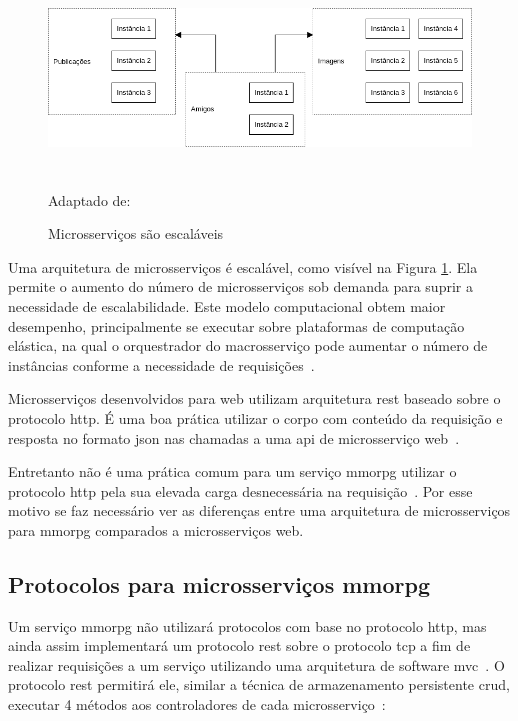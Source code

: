 \begin{figure}[htb!]
\caption{Microsserviços são escaláveis}
\label{fig:microsservicos_escalabilidade}
\includegraphics[height=5cm]{img/cap2/microsservicos_escalabilidade.png}
\centering

Adaptado de:~\cite{Newman2015Feb}
\end{figure}



Uma arquitetura de microsserviços é escalável, como visível na Figura \ref{fig:microsservicos_escalabilidade}.
%
Ela permite o aumento do número de microsserviços sob demanda para suprir a necessidade de escalabilidade.
%
Este modelo computacional obtem maior desempenho, principalmente se executar sobre plataformas de computação elástica, na qual o orquestrador do macrosserviço pode aumentar o número de instâncias conforme a necessidade de requisições~\cite{Nadareishvili2016Aug}.



Microsserviços desenvolvidos para web utilizam arquitetura \ac{rest} baseado sobre o protocolo \ac{http}.
%
É uma boa prática utilizar o corpo com conteúdo da requisição e resposta no formato \ac{json} nas chamadas a uma \ac{api} de microsserviço web~\cite{Nadareishvili2016Aug}.



Entretanto não é uma prática comum para um serviço \ac{mmorpg} utilizar o protocolo \ac{http} pela sua elevada carga desnecessária na requisição~\cite{1417630}.
%
Por esse motivo se faz necessário ver as diferenças entre uma arquitetura de microsserviços para \ac{mmorpg} comparados a microsserviços web.



\subsection{Protocolos para microsserviços \ac{mmorpg}}



Um serviço \ac{mmorpg} não utilizará protocolos com base no protocolo \ac{http}, mas ainda assim implementará um protocolo \ac{rest} sobre o protocolo \ac{tcp} a fim de realizar requisições a um serviço utilizando uma arquitetura de software \ac{mvc}~\cite{Chadwick2012Oct, LeckyThompson2008Nov}.
%
O protocolo \ac{rest} permitirá ele, similar a técnica de armazenamento persistente \ac{crud}, executar 4 métodos aos controladores de cada microsserviço~\cite{6267019}:



